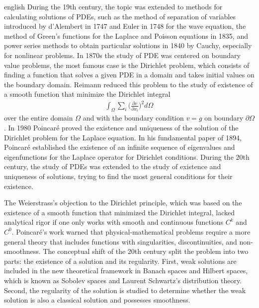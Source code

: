 \documentclass[../0000.tex]{subfiles}
\begin{document}
\begin{hyphenrules}{english}
During the 19th century, the topic was extended to methods for calculating solutions of PDEs, such as the method of separation of variables introduced by 
d'Alembert in 1747 and Euler in 1748 for the wave equation, the method of Green's functions for the Laplace and Poisson equations in 1835, and power series methods to 
obtain particular solutions in 1840 by Cauchy, especially for nonlinear problems. In 1870s the study of PDE was centered on boundary value problems, the most famous
case is the Dirichlet problem, which consists of finding a function that solves a given PDE in a domain and takes initial values on the boundary domain. Reimann
reduced this problem to the study of existence of a smooth function that minimize the Dirichlet integral
\begin{align*}
    \int_{\Omega} \sum_i \bigg( \frac{\partial v}{\partial x_i}\bigg)^2 d\Omega
\end{align*}
over the entire domain $\Omega$ and with the boundary condition $v = g$ on boundary $\partial\Omega$. In 1980 Poincaré proved the existence and uniqueness of the 
solution of the Dirichlet problem for the Laplace equation. In his fundamental paper of 1894, Poincaré established the existence of an infinite sequence of
eigenvalues and eigenfunctions for the Laplace operator for Dirichlet conditions. During the 20th century, the study of PDEs was extended to the study of existence
and uniqueness of solutions, trying to find the most general conditions for their existence.

The Weierstrass's objection to the Dirichlet principle, which was based on the existence of a smooth function that minimized the Dirichlet integral,
lacked analytical rigor if one only works with smooth and continuous functions $C^k$ and $C^0$. Poincaré's work warned that physical-mathematical problems require
a more general theory that includes functions with singularities, discontinuities, and non-smoothness. The conceptual shift of the 20th century
split the problem into two parts: the existence of a solution and its regularity. First, weak solutions are included in the new theoretical framework in Banach
spaces and Hilbert spaces, which is known as Sobolev spaces and Laurent Schwartz's distribution theory. Second, the regularity of the solution is studied to 
determine whether the weak solution is also a classical solution and possesses smoothness. 


\end{hyphenrules}
\end{document}
